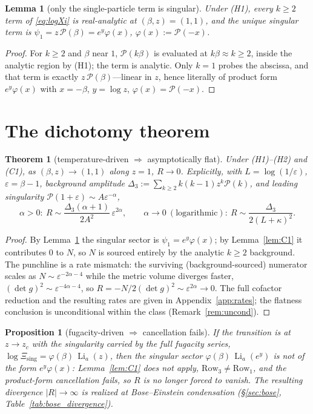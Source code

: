\documentclass[a4paper,11pt]{article}
\theoremstyle{plain}
\newtheorem{theorem}{Theorem}
\newtheorem{lemma}{Lemma}
\newtheorem{proposition}{Proposition}
\theoremstyle{definition}
\theoremstyle{remark}
\newcommand{\Ric}{R}
\newcommand{\Li}{\operatorname{Li}}
\newcommand{\eps}{\varepsilon}
\newcommand{\detg}{\det g}
\begin{document}
\begin{lemma}[only the single-particle term is singular]\label{lem:k1}
Under \textnormal{(H1)}, every $k\ge2$ term of \eqref{eq:logXi} is real-analytic at
$(\beta,z)=(1,1)$, and the unique singular term is
$\psi_1=z\,\mathcal P(\beta)=e^{y}\varphi(x)$, $\varphi(x):=\mathcal P(-x)$.
\end{lemma}
\begin{proof}
For $k\ge2$ and $\beta$ near $1$, $\mathcal P(k\beta)$ is evaluated at $k\beta\approx k\ge2$, inside
the analytic region by (H1); the term is analytic. Only $k=1$ probes the abscissa, and that term is
exactly $z\,\mathcal P(\beta)$---linear in $z$, hence literally of product form $e^{y}\varphi(x)$ with
$x=-\beta$, $y=\log z$, $\varphi(x)=\mathcal P(-x)$.
\end{proof}

\section{The dichotomy theorem}\label{sec:thm}

\begin{theorem}[temperature-driven $\Rightarrow$ asymptotically flat]\label{thm:flat}
Under \textnormal{(H1)--(H2)} and \textnormal{(C1)}, as $(\beta,z)\to(1,1)$ along $z=1$,
$\Ric\to0$. Explicitly, with $L=\log(1/\eps)$, $\eps=\beta-1$, background amplitude
$\Delta_3:=\sum_{k\ge2}k(k-1)z^{k}\mathcal P(k)$, and leading singularity $\mathcal P(1+\eps)\sim A\eps^{-\alpha}$,
\[
   \alpha>0:\ \Ric\sim\frac{\Delta_3(\alpha+1)}{2A^{2}}\,\eps^{2\alpha},
   \qquad
   \alpha\to0\ (\text{logarithmic}):\ \Ric\sim\frac{\Delta_3}{2(L+\kappa)^{2}}.
\]
\end{theorem}
\begin{proof}
By Lemma~\ref{lem:k1} the singular sector is $\psi_1=e^{y}\varphi(x)$; by Lemma~\ref{lem:C1} it
contributes $0$ to $N$, so $N$ is sourced entirely by the analytic $k\ge2$ background. The punchline is a
rate mismatch: the surviving (background-sourced) numerator scales as $N\sim\eps^{-2\alpha-4}$ while the
metric volume diverges faster, $(\detg)^2\sim\eps^{-4\alpha-4}$, so $\Ric=-N/2(\detg)^2\sim\eps^{2\alpha}\to0$.
The full cofactor reduction and the resulting rates are given in Appendix~\ref{app:rates}; the flatness
conclusion is unconditional within the class (Remark~\ref{rem:uncond}).
\end{proof}

\begin{proposition}[fugacity-driven $\Rightarrow$ cancellation fails]\label{prop:div}
If the transition is at $z\to z_c$ with the singularity carried by the full fugacity series,
$\log\Xi_{\mathrm{sing}}=\varphi(\beta)\,\Li_a(z)$, then the singular sector
$\varphi(\beta)\,\Li_a(e^{y})$ is not of the form $e^{y}\varphi(x)$: Lemma~\ref{lem:C1} does not apply,
$\mathrm{Row}_3\ne\mathrm{Row}_1$, and the product-form cancellation \emph{fails}, so $\Ric$ is no longer
forced to vanish. The resulting divergence $|\Ric|\to\infty$ is realized at Bose--Einstein condensation
(\S\ref{sec:bose}, Table~\ref{tab:bose_divergence}).
\end{proposition}
\end{document}
